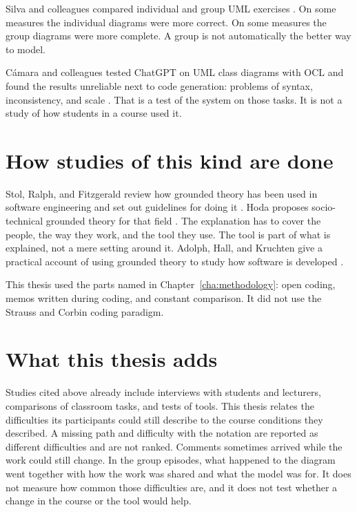 Silva and colleagues compared individual and group UML exercises \cite{silva2018group}. On some measures the individual diagrams were more correct. On some measures the group diagrams were more complete. A group is not automatically the better way to model.

C\'amara and colleagues tested ChatGPT on UML class diagrams with OCL and found the results unreliable next to code generation: problems of syntax, inconsistency, and scale \cite{camara2023chatgpt}. That is a test of the system on those tasks. It is not a study of how students in a course used it.

\section{How studies of this kind are done}
\label{sec:rw_competence_methods}

Stol, Ralph, and Fitzgerald review how grounded theory has been used in software engineering and set out guidelines for doing it \cite{stol2016grounded}. Hoda proposes socio-technical grounded theory for that field \cite{hoda2018socio}. The explanation has to cover the people, the way they work, and the tool they use. The tool is part of what is explained, not a mere setting around it. Adolph, Hall, and Kruchten give a practical account of using grounded theory to study how software is developed \cite{adolph2011using}.

This thesis used the parts named in Chapter~\ref{cha:methodology}: open coding, memos written during coding, and constant comparison. It did not use the Strauss and Corbin coding paradigm.

\section{What this thesis adds}
\label{sec:rw_summary_positioning}

Studies cited above already include interviews with students and lecturers, comparisons of classroom tasks, and tests of tools. This thesis relates the difficulties its participants could still describe to the course conditions they described. A missing path and difficulty with the notation are reported as different difficulties and are not ranked. Comments sometimes arrived while the work could still change. In the group episodes, what happened to the diagram went together with how the work was shared and what the model was for. It does not measure how common those difficulties are, and it does not test whether a change in the course or the tool would help.
